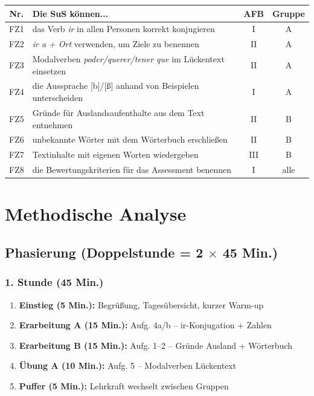 \documentclass[11pt,a4paper]{article}
\begin{document}
\begin{tabular}{|c|p{7cm}|c|c|}
\hline
\textbf{Nr.} & \textbf{Die SuS können...} & \textbf{AFB} & \textbf{Gruppe} \\
\hline
FZ1 & das Verb \textit{ir} in allen Personen korrekt konjugieren & I & A \\
\hline
FZ2 & \textit{ir a + Ort} verwenden, um Ziele zu benennen & II & A \\
\hline
FZ3 & Modalverben \textit{poder/querer/tener que} im Lückentext einsetzen & II & A \\
\hline
FZ4 & die Aussprache [b]/[\ss] anhand von Beispielen unterscheiden & I & A \\
\hline
FZ5 & Gründe für Auslandsaufenthalte aus dem Text entnehmen & II & B \\
\hline
FZ6 & unbekannte Wörter mit dem Wörterbuch erschließen & II & B \\
\hline
FZ7 & Textinhalte mit eigenen Worten wiedergeben & III & B \\
\hline
FZ8 & die Bewertungskriterien für das Assessment benennen & I & alle \\
\hline
\end{tabular}

\section{Methodische Analyse}

\subsection{Phasierung (Doppelstunde = 2 $\times$ 45 Min.)}

\subsubsection{1. Stunde (45 Min.)}
\begin{enumerate}
    \item \textbf{Einstieg (5 Min.):} Begrüßung, Tagesübersicht, kurzer Warm-up
    \item \textbf{Erarbeitung A (15 Min.):} Aufg. 4a/b -- ir-Konjugation + Zahlen
    \item \textbf{Erarbeitung B (15 Min.):} Aufg. 1--2 -- Gründe Ausland + Wörterbuch
    \item \textbf{Übung A (10 Min.):} Aufg. 5 -- Modalverben Lückentext
    \item \textbf{Puffer (5 Min.):} Lehrkraft wechselt zwischen Gruppen
\end{enumerate}
\end{document}
